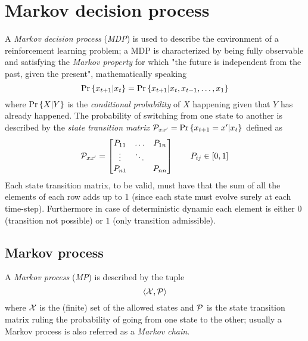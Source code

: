 \section{Markov decision process}
	A \textit{Markov decision process} (\textit{MDP}) is used to describe the environment of a reinforcement learning problem; a MDP is characterized by being fully observable and satisfying the \textit{Markov property} for which "the future is independent from the past, given the present", mathematically speaking
	\begin{equation}
		\textrm{Pr}\left\{x_{t+1}|x_t\right\} = \textrm{Pr}\left\{x_{t+1}|x_t, x_{t-1}, \dots, x_1\right\}
	\end{equation}
	where $\textrm{Pr}\left\{X|Y\right\}$ is the \textit{conditional probability} of $X$ happening given that $Y$ has already happened. The probability of switching from one state to another is described by the \textit{state transition matrix} $\mathcal P_{xx'} = \textrm{Pr}\left\{x_{t+1} = x' | x_t\right\}$ defined as
	\begin{equation}
		\mathcal P_{xx'} = \begin{bmatrix}
			P_{11} & \dots & P_{1n} \\ 
			\vdots & \ddots \\
			P_{n1} & & P_{nn}
		\end{bmatrix} \qquad P_{ij} \in [0,1]
	\end{equation}
	Each state transition matrix, to be valid, must have that the sum of all the elements of each row adds up to 1 (since each state must evolve surely at each time-step). Furthermore in case of deterministic dynamic each element is either $0$ (transition not possible) or $1$ (only transition admissible).
	
\subsection*{Markov process}
	A \textit{Markov process} (\textit{MP}) is described by the tuple
	\begin{equation}
		\langle \mathcal X, \mathcal P \rangle
	\end{equation}
	where $\mathcal X$ is the (finite) set of the allowed states and $\mathcal P$ is the state transition matrix ruling the probability of going from one state to the other; usually a Markov process is also referred as a \textit{Markov chain}.
	
